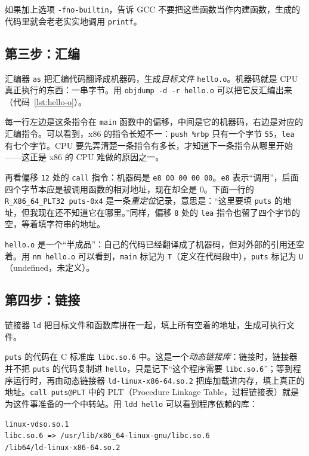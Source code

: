 如果加上选项 \texttt{-fno-builtin}，告诉 GCC 不要把这些函数当作内建函数，生成的代码里就会老老实实地调用 \texttt{printf}。

\subsection{第三步：汇编}

汇编器 \texttt{as} 把汇编代码翻译成机器码，生成\emph{目标文件} \texttt{hello.o}。机器码就是 CPU 真正执行的东西：一串字节。用 \texttt{objdump -d -r hello.o} 可以把它反汇编出来（代码~\ref{lst:hello-o}）。


每一行左边是这条指令在 \texttt{main} 函数中的偏移，中间是它的机器码，右边是对应的汇编指令。可以看到，x86 的指令长短不一：\texttt{push \%rbp} 只有一个字节 \texttt{55}，\texttt{lea} 有七个字节。CPU 要先弄清楚一条指令有多长，才知道下一条指令从哪里开始——这正是 x86 的 CPU 难做的原因之一。

再看偏移 \texttt{12} 处的 \texttt{call} 指令：机器码是 \texttt{e8 00 00 00 00}。\texttt{e8} 表示“调用”，后面四个字节本应是被调用函数的相对地址，现在却全是 0。下面一行的 \texttt{R\_X86\_64\_PLT32 puts-0x4} 是一条\emph{重定位}记录，意思是：“这里要填 \texttt{puts} 的地址，但我现在还不知道它在哪里。”同样，偏移 \texttt{8} 处的 \texttt{lea} 指令也留了四个字节的空，等着填字符串的地址。

\texttt{hello.o} 是一个“半成品”：自己的代码已经翻译成了机器码，但对外部的引用还空着。用 \texttt{nm hello.o} 可以看到，\texttt{main} 标记为 \texttt{T}（定义在代码段中），\texttt{puts} 标记为 \texttt{U}（undefined，未定义）。

\subsection{第四步：链接}

链接器 \texttt{ld} 把目标文件和函数库拼在一起，填上所有空着的地址，生成可执行文件。

\texttt{puts} 的代码在 C 标准库 \texttt{libc.so.6} 中。这是一个\emph{动态链接库}：链接时，链接器并不把 \texttt{puts} 的代码复制进 \texttt{hello}，只是记下“这个程序需要 \texttt{libc.so.6}”；等到程序运行时，再由动态链接器 \texttt{ld-linux-x86-64.so.2} 把库加载进内存，填上真正的地址。\texttt{call puts@PLT} 中的 PLT（Procedure Linkage Table，过程链接表）就是为这件事准备的一个中转站。用 \texttt{ldd hello} 可以看到程序依赖的库：
\begin{verbatim}
linux-vdso.so.1
libc.so.6 => /usr/lib/x86_64-linux-gnu/libc.so.6
/lib64/ld-linux-x86-64.so.2
\end{verbatim}


